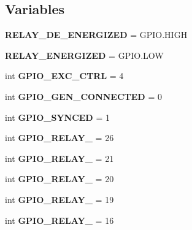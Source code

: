 \subsection*{Variables}
\begin{DoxyCompactItemize}
\item 
\mbox{\label{namespacegpio_a07bc152a5622ecda0d3a5d36ef6387c6}} 
{\bfseries R\+E\+L\+A\+Y\+\_\+\+D\+E\+\_\+\+E\+N\+E\+R\+G\+I\+Z\+ED} = G\+P\+I\+O.\+H\+I\+GH
\item 
\mbox{\label{namespacegpio_a480916c55d5fceca402241cdb5d7384b}} 
{\bfseries R\+E\+L\+A\+Y\+\_\+\+E\+N\+E\+R\+G\+I\+Z\+ED} = G\+P\+I\+O.\+L\+OW
\item 
\mbox{\label{namespacegpio_a751ae4addce4edea916caf888b13c94b}} 
int {\bfseries G\+P\+I\+O\+\_\+\+E\+X\+C\+\_\+\+C\+T\+RL} = 4
\item 
\mbox{\label{namespacegpio_a3be8b9672fc1d79722170dbecba325e2}} 
int {\bfseries G\+P\+I\+O\+\_\+\+G\+E\+N\+\_\+\+C\+O\+N\+N\+E\+C\+T\+ED} = 0
\item 
\mbox{\label{namespacegpio_a2dceea329439c4c88e2da7b33014a464}} 
int {\bfseries G\+P\+I\+O\+\_\+\+S\+Y\+N\+C\+ED} = 1
\item 
\mbox{\label{namespacegpio_a23fffe1ab414509d4ff4f2b9ef6926b6}} 
int {\bfseries G\+P\+I\+O\+\_\+\+R\+E\+L\+A\+Y\+\_} = 26
\item 
\mbox{\label{namespacegpio_a33b90621472c4c7e9930d1c049b4dfe8}} 
int {\bfseries G\+P\+I\+O\+\_\+\+R\+E\+L\+A\+Y\+\_} = 21
\item 
\mbox{\label{namespacegpio_ab84460345cdf1efbd1f56e1b2961ab1b}} 
int {\bfseries G\+P\+I\+O\+\_\+\+R\+E\+L\+A\+Y\+\_} = 20
\item 
\mbox{\label{namespacegpio_ae414a29faa48c227cc8fc86845a96bd0}} 
int {\bfseries G\+P\+I\+O\+\_\+\+R\+E\+L\+A\+Y\+\_} = 19
\item 
\mbox{\label{namespacegpio_ae29eb4b46d38b49ca134b48d8a78f2a2}} 
int {\bfseries G\+P\+I\+O\+\_\+\+R\+E\+L\+A\+Y\+\_} = 16

\end{DoxyCompactItemize}
